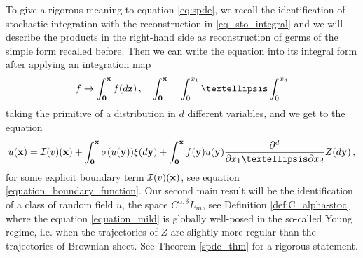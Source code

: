 \documentclass[12pt]{article}
\numberwithin{equation}{section}
\theoremstyle{plain}
\theoremstyle{definition}
\def\fy{\mathbf y}\def\fz{\mathbf z}
\def\foo{{\boldsymbol 0}}
\begin{document}
To give a rigorous meaning to  equation \eqref{eq:spde}, we recall the identification of stochastic integration with the reconstruction in \eqref{eq_sto_integral} and we will describe the products  in the right-hand side as reconstruction of germs of the simple form recalled before. Then we can write the equation into its integral form after applying an integration map
\[f\to \int_{\foo}^{\fx}f (d\fz)\,, \quad \int_{\foo}^{\fx}= \int_{0}^{x_1} \ldots \int_{0}^{x_d} \]
taking the primitive of a distribution in $d$ different variables, and we get to the equation 
\begin{equation}\label{equation_mild}
   u(\fx) =  \mathcal{I}(v)(\fx) + \int_{\foo}^{\fx} \sigma(u(\fy)) \xi(d\fy) + \int_\foo^\fx f(\fy)u(\fy)\frac{\partial^d }{\partial x_1\ldots \partial x_d}Z(d\fy) \,,
\end{equation}
for some explicit boundary term $\mathcal I(v)(\mathbf x)$, see equation \eqref{equation_boundary_function}. Our second main result will be the identification of a class of random field $u$, the space $C^{\alpha, \delta}L_m$, see Definition \ref{def:C_alpha-stoc} where the equation \eqref{equation_mild} is globally well-posed in the so-called Young regime, i.e. when the trajectories of $Z$ are slightly more regular than the trajectories of Brownian sheet. See Theorem \ref{spde_thm} for a rigorous statement.
\end{document}
